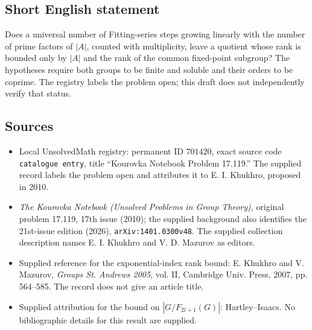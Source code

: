\documentclass[11pt]{article}
\begin{document}
\subsection{Short English statement}
Does a universal number of Fitting-series steps growing linearly with the number of prime factors of \(|A|\), counted with multiplicity, leave a quotient whose rank is bounded only by \(|A|\) and the rank of the common fixed-point subgroup? The hypotheses require both groups to be finite and soluble and their orders to be coprime. The registry labels the problem open; this draft does not independently verify that status.
\subsection{Sources}
\begin{itemize}
\item Local UnsolvedMath registry: permanent ID \(701420\), exact source code \texttt{catalogue entry}, title ``Kourovka Notebook Problem 17.119.'' The supplied record labels the problem open and attributes it to E. I. Khukhro, proposed in 2010.
\item \emph{The Kourovka Notebook (Unsolved Problems in Group Theory)}, original problem 17.119, 17th issue (2010); the supplied background also identifies the 21st-issue edition (2026), \texttt{arXiv:1401.0300v48}. The supplied collection description names E. I. Khukhro and V. D. Mazurov as editors.
\item Supplied reference for the exponential-index rank bound: E. Khukhro and V. Mazurov, \emph{Groups St. Andrews 2005}, vol. II, Cambridge Univ. Press, 2007, pp. 564--585. The record does not give an article title.
\item Supplied attribution for the bound on \(|G/F_{2l+1}(G)|\): Hartley--Isaacs. No bibliographic details for this result are supplied.
\end{itemize}
\end{document}
